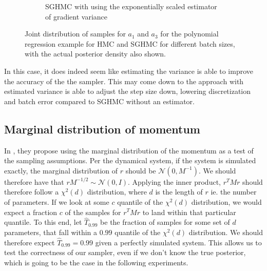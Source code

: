 \begin{figure}[htbp]
\begin{subfigure}[t]{0.4\textwidth}
        \caption{SGHMC with using the exponentially scaled estimator of gradient variance}
    \end{subfigure}
    \caption{Joint distribution of samples for $a_1$ and $a_3$ for the polynomial regression example for HMC and SGHMC for different batch sizes, with the actual posterior density also shown.}
    \label{fig:simualted_var_est_joint_comp}
\end{figure}
In this case, it does indeed seem like estimating the variance is able to improve the accuracy of the the sampler.
This may come down to the approach with estimated variance is able to adjust the step size down, lowering discretization and batch error compared to SGHMC without an estimator. 

\subsection{Marginal distribution of momentum}

In \cite{wenzel_how_2020}, they propose using the marginal distribution of the momentum as a test of the sampling assumptions. 
Per the dynamical system, if the system is simulated exactly, the marginal distribution of $r$ should be $\mathcal{N}(0, M^{-1})$. 
We should therefore have that $r M^{-1/2} \sim \mathcal{N}(0, I)$. 
Applying the inner product, $r^T M r$ should therefore follow a $\chi^2(d)$ distribution, where $d$ is the length of $r$ ie. the number of parameters. 
If we look at some $c$ quantile of the $\chi^2(d)$ distribution, we would expect a fraction $c$ of the samples for $r^T M r$ to land within that particular quantile. 
To this end, let $\hat T_{0.99}$ be the fraction of samples for some set of $d$ parameters, that fall within a $0.99$ quantile of the $\chi^2(d)$ distribution. 
We should therefore expect $\hat T_{0.99}=0.99$ given a perfectly simulated system.
This allows us to test the correctness of our sampler, even if we don't know the true posterior, which is going to be the case in the following experiments.

